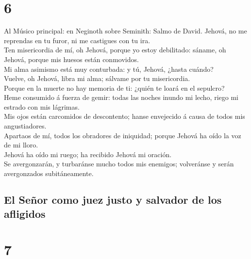 \hypertarget{section-19-6}{%
\section{6}\label{section-19-6}}

 Al Músico principal: en Neginoth sobre Seminith: Salmo de
David. Jehová, no me reprendas en tu furor, ni me castigues con tu
ira.\\
 Ten misericordia de mí, oh Jehová, porque yo estoy
debilitado: sáname, oh Jehová, porque mis huesos están conmovidos.\\
 Mi alma asimismo está muy conturbada: y tú, Jehová,
¿hasta cuándo?\\
 Vuelve, oh Jehová, libra mi alma; sálvame por tu
misericordia.\\
 Porque en la muerte no hay memoria de ti: ¿quién te loará
en el sepulcro?\\
 Heme consumido á fuerza de gemir: todas las noches inundo
mi lecho, riego mi estrado con mis lágrimas.\\
 Mis ojos están carcomidos de descontento; hanse
envejecido á causa de todos mis angustiadores.\\
 Apartaos de mí, todos los obradores de iniquidad; porque
Jehová ha oído la voz de mi lloro.\\
 Jehová ha oído mi ruego; ha recibido Jehová mi oración.\\
 Se avergonzarán, y turbaránse mucho todos mis enemigos;
volveránse y serán avergonzados subitáneamente.

\hypertarget{el-seuxf1or-como-juez-justo-y-salvador-de-los-afligidos}{%
\subsection{El Señor como juez justo y salvador de los
afligidos}\label{el-seuxf1or-como-juez-justo-y-salvador-de-los-afligidos}}

\hypertarget{section-19-7}{%
\section{7}\label{section-19-7}}

